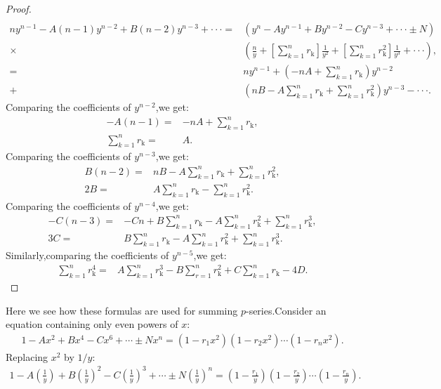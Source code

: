 \documentclass[a4paper,reqno,11pt]{book}
\theoremstyle{plain}%
\theoremstyle{definition}
\begin{document}
\begin{proof}
\begin{eqnarray*}
\end{eqnarray*}
\begin{align*}
    ny^{n-1}-A(n-1)y^{n-2}+B(n-2)y^{n-3}+\cdot\cdot\cdot=&(y^n-Ay^{n-1}+By^{n-2}-Cy^{n-3}+\cdot\cdot\cdot \pm N)\\
    \times&\left(\frac{n}{y}+\left[\sum_{k=1}^{n}r_{\text{k}}\right]\frac{1}{y^2}+\left[\sum_{k=1}^{n}r_{\text{k}}^2\right]\frac{1}{y^3}+\cdot\cdot\cdot\right),\\
    =&ny^{n-1}+\left(-nA+\sum_{k=1}^{n}r_{\text{k}}\right)y^{n-2}\\
    +&\left(nB-A\sum_{k=1}^{n}r_{\text{k}}+\sum_{k=1}^{n}r_{\text{k}}^2\right)y^{n-3}-\cdot\cdot\cdot.
\end{align*}
Comparing the coefficients of $y^{n-2}$,we get:
\begin{align*}
    -A(n-1)=&-nA+\sum_{k=1}^{n}r_{\text{k}},\\
    \sum_{k=1}^{n}r_{\text{k}}=&A.
\end{align*}
Comparing the coefficients of $y^{n-3}$,we get:
\begin{align*}
    B(n-2)=&nB-A\sum_{k=1}^{n}r_{\text{k}}+\sum_{k=1}^{n}r_{\text{k}}^2,\\
    2B=&A\sum_{k=1}^{n}r_{\text{k}}-\sum_{k=1}^{n}r_{\text{k}}^2.
\end{align*}
Comparing the coefficients of $y^{n-4}$,we get:
\begin{align*}
    -C(n-3)=&-Cn+B\sum_{k=1}^{n}r_{\text{k}}-A\sum_{k=1}^{n}r_{\text{k}}^2+\sum_{k=1}^{n}r_{\text{k}}^3,\\
        3C=&B\sum_{k=1}^{n}r_{\text{k}}-A\sum_{k=1}^{n}r_{\text{k}}^2+\sum_{k=1}^{n}r_{\text{k}}^3.
\end{align*}
Similarly,comparing the coefficients of $y^{n-5}$,we get:
\begin{eqnarray*}
        \sum_{k=1}^{n}r_{\text{k}}^4=&A\sum_{k=1}^{n}r_{\text{k}}^3-B\sum_{r=1}^{n}r_{\text{k}}^2+C\sum_{k=1}^{n}r_{\text{k}}-4D.
\end{eqnarray*}
\end{proof}
\noindent Here we see how these formulas are used for summing $p$-series.Consider an equation containing only even powers of $x$:
\begin{align}
    1-Ax^2+Bx^4-Cx^6+\cdots\pm Nx^n=(1-r_{1}x^2)(1-r_{2}x^2)\cdots(1-r_{n}x^2).
\end{align}
Replacing $x^2$ by $1/y$:
\begin{eqnarray*}
     1-A\left(\frac{1}{y}\right)+B\left(\frac{1}{y}\right)^2-C\left(\frac{1}{y}\right)^3+\cdots\pm N\left(\frac{1}{y}\right)^n=\left(1-\frac{r_{1}}{y}\right)\left(1-\frac{r_{2}}{y}\right)\cdots\left(1-\frac{r_{n}}{y}\right).
\end{eqnarray*}
\end{document}
